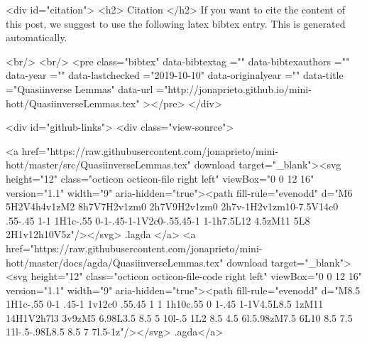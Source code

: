  
  <div id="citation">
  <h2> Citation </h2>
  If you want to cite the content of this post,
  we suggest to use the following latex bibtex entry.
  This is generated automatically.

  <br/>
  <br/>
  <pre class="bibtex"
       data-bibtextag =""
       data-bibtexauthors =""
       data-year =""
       data-lastchecked ="2019-10-10"
       data-originalyear =""
       data-title ="Quasiinverse Lemmas"
       data-url ="http://jonaprieto.github.io/mini-hott/QuasiinverseLemmas.tex"
  ></pre>
  </div>
  

  <div id="github-links">
    <div class="view-source">
      
        <a href="https://raw.githubusercontent.com/jonaprieto/mini-hott/master/src/QuasiinverseLemmas.tex" download target="_blank"><svg height="12" class="octicon octicon-file right left" viewBox="0 0 12 16" version="1.1" width="9" aria-hidden="true"><path fill-rule="evenodd" d="M6 5H2V4h4v1zM2 8h7V7H2v1zm0 2h7V9H2v1zm0 2h7v-1H2v1zm10-7.5V14c0 .55-.45 1-1 1H1c-.55 0-1-.45-1-1V2c0-.55.45-1 1-1h7.5L12 4.5zM11 5L8 2H1v12h10V5z"/></svg> .lagda </a>
        <a href="https://raw.githubusercontent.com/jonaprieto/mini-hott/master/docs/agda/QuasiinverseLemmas.tex" download target="_blank"><svg height="12" class="octicon octicon-file-code right left" viewBox="0 0 12 16" version="1.1" width="9" aria-hidden="true"><path fill-rule="evenodd" d="M8.5 1H1c-.55 0-1 .45-1 1v12c0 .55.45 1 1 1h10c.55 0 1-.45 1-1V4.5L8.5 1zM11 14H1V2h7l3 3v9zM5 6.98L3.5 8.5 5 10l-.5 1L2 8.5 4.5 6l.5.98zM7.5 6L10 8.5 7.5 11l-.5-.98L8.5 8.5 7 7l.5-1z"/></svg> .agda</a>
      
